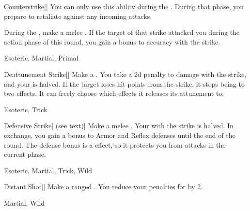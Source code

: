 \lowercase{\hypertarget{maneuver:Counterstrike}{}}\label{maneuver:Counterstrike}
\hypertarget{maneuver:Counterstrike}{}
\begin{freeability}[Rank 2]{Counterstrike}[]
You can only use this ability during the .
During that phase, you prepare to retaliate against any incoming attacks.

During the , make a melee .
If the target of that strike attacked you during the action phase of this round,
you gain a  bonus to accuracy with the strike.


 Esoteric, Martial, Primal
\end{freeability}
\vspace{0.25em}



\lowercase{\hypertarget{maneuver:Deattunement Strike}{}}\label{maneuver:Deattunement Strike}
\hypertarget{maneuver:Deattunement Strike}{}
\begin{freeability}[Rank 2]{Deattunement Strike}[]
Make a .
You take a \minus2d penalty to damage with the strike, and your  is halved.
If the target loses hit points from the strike, it stops being  to two effects.
It can freely choose which effects it releases its attunement to.


 Esoteric, Trick
\end{freeability}
\vspace{0.25em}



\lowercase{\hypertarget{maneuver:Defensive Strike}{}}\label{maneuver:Defensive Strike}
\hypertarget{maneuver:Defensive Strike}{}
\begin{freeability}[Rank 2]{Defensive Strike}[ (see text)]
Make a melee .
Your  with the strike is halved.
In exchange, you gain a  bonus to Armor and Reflex defenses until the end of the round.
The defense bonus is a  effect, so it protects you from attacks in the current phase.


 Esoteric, Martial, Trick, Wild
\end{freeability}
\vspace{0.25em}



\lowercase{\hypertarget{maneuver:Distant Shot}{}}\label{maneuver:Distant Shot}
\hypertarget{maneuver:Distant Shot}{}
\begin{freeability}[Rank 2]{Distant Shot}[]
Make a ranged .
You reduce your penalties for  by 2.


 Martial, Wild
\end{freeability}
\vspace{0.25em}



